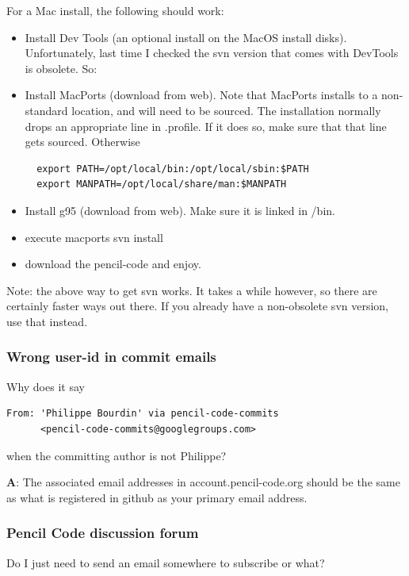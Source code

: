 \documentclass[\mydriver,12pt,twoside,notitlepage,a4paper]{article}
\begin{document}
For a Mac install, the following should work:

\begin{itemize}
\item[a)]
Install Dev Tools (an optional install on the MacOS install disks).
Unfortunately, last time I checked the svn version that comes with DevTools
is obsolete. So:
\item[b)]
Install MacPorts (download from web). Note that MacPorts installs to a
non-standard location, and will need to be sourced. The installation
normally drops an appropriate line in .profile. If it does so, make sure
that that line gets sourced. Otherwise

\begin{Verbatim}
  export PATH=/opt/local/bin:/opt/local/sbin:$PATH
  export MANPATH=/opt/local/share/man:$MANPATH
\end{Verbatim}

\item[c)]
Install g95 (download from web). Make sure it is linked in /bin.
\item[d)]
execute macports svn install
\item[e)]
download the pencil-code and enjoy.
\end{itemize}

Note: the above way to get svn works. It takes a while however, so there
are certainly faster ways out there. If you already have a non-obsolete svn
version, use that instead.

\subsubsection{Wrong user-id in commit emails}

Why does it say
\begin{Verbatim}
From: 'Philippe Bourdin' via pencil-code-commits
      <pencil-code-commits@googlegroups.com>
\end{Verbatim}
when the committing author is not Philippe?

\medskip

{\bf A}: The associated email addresses in account.pencil-code.org should
be the same as what is registered in github as your primary email address.

\subsubsection{Pencil Code discussion forum}

Do I just need to send an email somewhere to subscribe or what?
\end{document}
